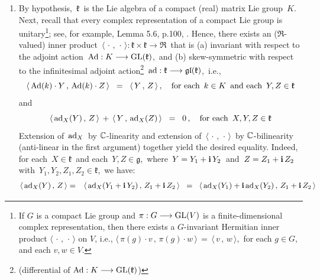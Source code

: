 \begin{enumerate}
\item
    By hypothesis, \,$\mathfrak{k}$\, is the Lie algebra of a compact (real) matrix Lie group \,$K$.\,
    Next, recall that every complex representation of a compact Lie group is
    unitary\footnote{If $G$ is a compact Lie group and $\pi : G \longrightarrow \textnormal{GL}(V)$
    is a finite-dimensional complex representation,
    then there exists a $G$-invariant Hermitian inner product
    $\langle\,\cdot\,,\,\cdot\,\rangle$ on $V$,
    i.e., $\langle\,\pi(g)\cdot v \,,\,\pi(g)\cdot w\,\rangle \,=\, \langle\,v\,,\,w\,\rangle$,\,
    for each $g \in G$, and each $v, w \in V$.}; see, for example, Lemma 5.6, p.100, \cite{Sepanski2010}.
    Hence, there exists an ($\Re$-valued) inner product
    \,$\langle\,\cdot\,,\,\cdot\,\rangle : \mathfrak{k} \times \mathfrak{k} \longrightarrow \Re$\,
    that is (a) invariant with respect to the adjoint action
    \,$\textnormal{Ad} : K \longrightarrow \textnormal{GL}(\mathfrak{k})$,\, and (b) skew-symmetric with respect to
    the infinitesimal adjoint
    action\footnote{(differential of $\textnormal{Ad} : K \longrightarrow \textnormal{GL}(\mathfrak{k})$)}
    \,$\textnormal{ad} : \mathfrak{k} \longrightarrow \mathfrak{gl}(\mathfrak{k})$,\, i.e.,
    \begin{equation}
    \langle\,\textnormal{Ad}(k) \cdot Y\,,\,\textnormal{Ad}(k) \cdot Z\,\rangle 
    \;\; = \;\;
        \langle\,Y\,,\,Z\,\rangle\,,
    \quad
    \textnormal{for each \,$k \in K$\, and each \,$Y,Z \in \mathfrak{k}$}
    \end{equation}
    and
    \begin{equation}
    \langle\,\textnormal{ad}_{X}(Y)\,,\,Z\,\rangle \,+\, \langle\,Y\,,\,\textnormal{ad}_{X}(Z)\,\rangle
    \;\; = \;\;
        0\,,
    \quad
    \textnormal{for each \,$X,Y,Z \in \mathfrak{k}$}
    \end{equation}
    Extension of \,$\textnormal{ad}_{X}$\, by {\color{red}$\mathbb{C}$-linearity} and
    extension of \,$\langle\,\cdot\,,\,\cdot\,\rangle$\, by {\color{red}$\mathbb{C}$-bilinearity}
    (anti-linear in the first argument)
    together yield the desired equality.
    Indeed, for each \,$X \in \mathfrak{k}$\, and each \,$Y, Z \in \mathfrak{g}$,\,
    where \,$Y = Y_{1} + \mathbf{i}\,Y_{2}$\, and \,$Z = Z_{1} + \mathbf{i}\,Z_{2}$\,
    with \,$Y_{1}, Y_{2}, Z_{1}, Z_{2} \in \mathfrak{k}$,\, we have:
    \begin{eqnarray*}
    \langle\,\ad_{X}(Y)\,,\,Z\,\rangle
    & = &
        \langle\,\ad_{X}(Y_{1}+\i\,Y_{2})\,,\,Z_{1} + \i\,Z_{2}\,\rangle
    \;\; = \;\;
        \langle\,\ad_{X}(Y_{1})+\i\,\ad_{X}(Y_{2})\,,\,Z_{1} + \i\,Z_{2}\,\rangle
    \\

\end{eqnarray*}
\end{enumerate}
